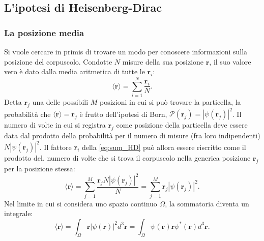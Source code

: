 \documentclass[a4paper,11pt]{report}
\begin{document}
\subsection{L'ipotesi di Heisenberg-Dirac}
\subsubsection{La posizione media}
Si vuole cercare in primis di trovare un modo per conoscere informazioni sulla posizione del corpuscolo. Condotte $N$ misure della sua posizione $\bm{r}$, il suo valore vero è dato dalla media aritmetica di tutte le $\bm{r}_i$:
\begin{equation}
    \langle \bm{r} \rangle = \sum_{i = 1}^N \frac{\bm{r}_i}{N}.
    \label{eq:sum_HD}
\end{equation}
Detta $\bm{r}_j$ una delle possibili $M$ posizioni in cui si può trovare la particella, la probabilità che $\langle \bm{r} \rangle = \bm{r}_j$ è frutto dell'ipotesi di Born, $ \mathcal{P}(\bm{r}_j) = |\psi(\bm{r}_j)|^2$. Il numero di volte in cui si registra $\bm{r}_j$ come posizione della particella deve essere data dal prodotto della probabilità per il numero di misure (fra loro indipendenti) $ N|\psi(\bm{r}_j)|^2$. Il fattore $\bm{r}_i$ della \eqref{eq:sum_HD} può allora essere riscritto come il prodotto del. numero di volte che si trova il corpuscolo nella generica posizione $\bm{r}_j$ per la posizione stessa: 
\begin{equation}
    \langle \bm{r} \rangle = \sum_{j = 1}^M \frac{\bm{r}_jN|\psi(\bm{r}_j)|^2}{N} = \sum_{j = 1}^M\bm{r}_j|\psi(\bm{r}_j)|^2.
\end{equation}
Nel limite in cui si considera uno spazio continuo $\Omega$, la sommatoria diventa un integrale:
\begin{equation}
    \langle \bm{r} \rangle = \int_\Omega \bm{r}|\psi(\bm{r})|^2 d^3\bm{r} = \int_\Omega  \psi(\bm{r})\bm{r}\psi^*(\bm{r}) d^3\bm{r}.
    \label{eq:r_q}
\end{equation}
\end{document}

